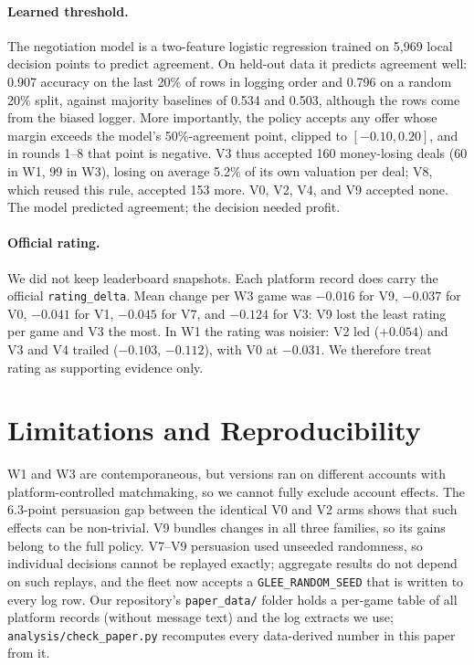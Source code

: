\documentclass{article}
\begin{document}
\paragraph{Learned threshold.}
The negotiation model is a two-feature logistic regression trained on 5{,}969 local decision points to predict agreement. On held-out data it predicts agreement well: 0.907 accuracy on the last 20\% of rows in logging order and 0.796 on a random 20\% split, against majority baselines of 0.534 and 0.503, although the rows come from the biased logger. More importantly, the policy accepts any offer whose margin exceeds the model's 50\%-agreement point, clipped to $[-0.10, 0.20]$, and in rounds 1--8 that point is negative. V3 thus accepted 160 money-losing deals (60 in W1, 99 in W3), losing on average 5.2\% of its own valuation per deal; V8, which reused this rule, accepted 153 more. V0, V2, V4, and V9 accepted none. The model predicted agreement; the decision needed profit.

\paragraph{Official rating.}
We did not keep leaderboard snapshots. Each platform record does carry the official \texttt{rating\_delta}. Mean change per W3 game was $-0.016$ for V9, $-0.037$ for V0, $-0.041$ for V1, $-0.045$ for V7, and $-0.124$ for V3: V9 lost the least rating per game and V3 the most. In W1 the rating was noisier: V2 led ($+0.054$) and V3 and V4 trailed ($-0.103$, $-0.112$), with V0 at $-0.031$. We therefore treat rating as supporting evidence only.

\section{Limitations and Reproducibility}

W1 and W3 are contemporaneous, but versions ran on different accounts with platform-controlled matchmaking, so we cannot fully exclude account effects. The 6.3-point persuasion gap between the identical V0 and V2 arms shows that such effects can be non-trivial. V9 bundles changes in all three families, so its gains belong to the full policy. V7--V9 persuasion used unseeded randomness, so individual decisions cannot be replayed exactly; aggregate results do not depend on such replays, and the fleet now accepts a \texttt{GLEE\_RANDOM\_SEED} that is written to every log row. Our repository's \texttt{paper\_data/} folder holds a per-game table of all platform records (without message text) and the log extracts we use; \texttt{analysis/check\_paper.py} recomputes every data-derived number in this paper from it.
\end{document}
